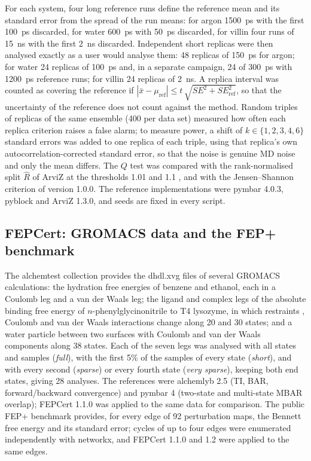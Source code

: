 \documentclass[9pt,lessons]{livecoms}
\begin{document}
For each system, four long reference runs define the reference mean and its standard error from the spread of the run means: for argon 1500~ps with the first 100~ps discarded, for water 600~ps with 50~ps discarded, for villin four runs of 15~ns with the first 2~ns discarded. Independent short replicas were then analysed exactly as a user would analyse them: 48 replicas of 150~ps for argon; for water 24 replicas of 100~ps and, in a separate campaign, 24 of 300~ps with 1200~ps reference runs; for villin 24 replicas of 2~ns. A replica interval was counted as covering the reference if $|\bar{x} - \mu_{\mathrm{ref}}| \le t\,\sqrt{SE^2 + SE_{\mathrm{ref}}^2}$, so that the uncertainty of the reference does not count against the method. Random triples of replicas of the same ensemble (400 per data set) measured how often each replica criterion raises a false alarm; to measure power, a shift of $k \in \{1,2,3,4,6\}$ standard errors was added to one replica of each triple, using that replica's own autocorrelation-corrected standard error, so that the noise is genuine MD noise and only the mean differs. The $Q$ test was compared with the rank-normalised split $\hat{R}$ of ArviZ \cite{vehtari2021,kumar2019} at the thresholds 1.01 \cite{vehtari2021} and 1.1 \cite{gelman1992,brooks1998}, and with the Jensen--Shannon criterion of version 1.0.0. The reference implementations were pymbar 4.0.3, pyblock and ArviZ 1.3.0, and seeds are fixed in every script.

\subsection{FEPCert: GROMACS data and the FEP+ benchmark}
The alchemtest collection provides the dhdl.xvg files of several GROMACS calculations: the hydration free energies of benzene and ethanol, each in a Coulomb leg and a van der Waals leg; the ligand and complex legs of the absolute binding free energy of $n$-phenylglycinonitrile to T4 lysozyme, in which restraints \cite{boresch2003}, Coulomb and van der Waals interactions change along 20 and 30 states; and a water particle between two surfaces with Coulomb and van der Waals components along 38 states. Each of the seven legs was analysed with all states and samples (\emph{full}), with the first 5\% of the samples of every state (\emph{short}), and with every second (\emph{sparse}) or every fourth state (\emph{very sparse}), keeping both end states, giving 28 analyses. The references were alchemlyb 2.5 \cite{wu2024} (TI, BAR, forward/backward convergence) and pymbar 4 \cite{shirts2008} (two-state and multi-state MBAR overlap); FEPCert 1.1.0 was applied to the same data for comparison. The public FEP+ benchmark \cite{ross2023} provides, for every edge of 92 perturbation maps, the Bennett free energy and its standard error; cycles of up to four edges were enumerated independently with networkx, and FEPCert 1.1.0 and 1.2 were applied to the same edges.
\end{document}
